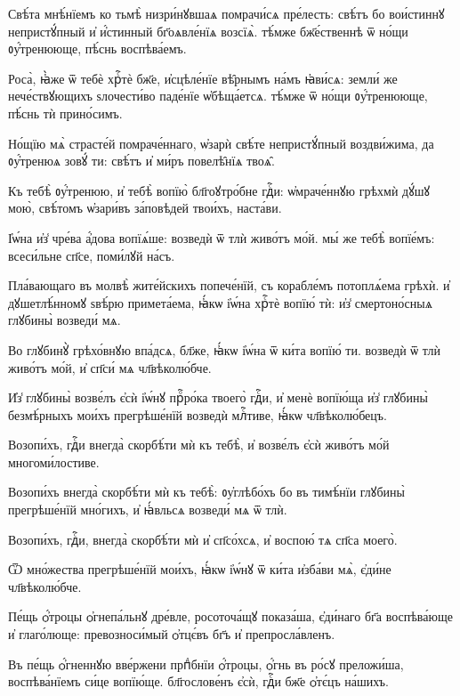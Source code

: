 \hKv Свѣ́та мнѣ́нїемъ ко тьмѣ̀ низри́нꙋвшаѧ помрачи́сѧ  пре́лесть: свѣ́тъ бо вои́стиннꙋ  непристꙋ́пный и҆ и҆́стинный бг҃оѧвле́нїѧ возсїѧ̀.  тѣ́мже бж҃е́ственнѣ ѿ но́щи ᲂу҆́тренююще, пѣ́снь  воспѣва́емъ. 

\hKv Роса̀, ꙗ҆̀же ѿ тебѐ хрⷭ҇тѐ бж҃е, и҆сцѣле́нїе вѣ̑рнымъ  на́мъ ꙗ҆ви́сѧ: земли́ же нече́ствꙋющихъ ѕлочести́во  паде́нїе ѡ҆бѣща́етсѧ. тѣ́мже ѿ но́щи ᲂу҆́тренююще,  пѣ́снь тѝ прино́симъ.  

\hKv Но́щїю мѧ̀ страсте́й помраче́ннаго, ѡ҆зарѝ свѣ́те  непристꙋ́пный воздви́жима, да ᲂу҆́тренюѧ зовꙋ́ ти: свѣ́тъ  и҆ ми́ръ повелѣ̑нїѧ твоѧ̑.  

\hKv Къ тебѣ̀ ᲂу҆́тренюю, и҆ тебѣ̀ вопїю̀ бл҃гоꙋтро́бне гдⷭ҇и:  ѡ҆мраче́ннꙋю грѣхмѝ дꙋ́шꙋ мою̀, свѣ́томъ ѡ҆зари́въ  за́повѣдей твои́хъ, наста́ви. 
%

\hKv І҆ѡ́на и҆з̾ чре́ва а҆́дова вопїѧ́ше: возведѝ ѿ тлѝ  живо́тъ мо́й. мы́ же тебѣ̀ вопїе́мъ: всеси́льне сп҃се,  поми́лꙋй на́съ.  
%

\hKv Пла́вающаго въ молвѣ̀ жите́йскихъ  попече́нїй, съ корабле́мъ потоплѧ́ема грѣхѝ. и҆  дꙋшетлѣ́нномꙋ ѕвѣ́рю примета́ема, ꙗ҆́кѡ і҆ѡ́на хрⷭ҇тѐ  вопїю́ тѝ: и҆з̾ смертоно́сныѧ глꙋбины̀ возведи́ мѧ. 
%

\hKv Во глꙋбинꙋ̀ грѣхо́внꙋю впа́дсѧ, бл҃же, ꙗ҆́кѡ і҆ѡ́на ѿ  ки́та вопїю́ ти. возведѝ ѿ тлѝ живо́тъ мо́й, и҆ сп҃си́  мѧ чл҃вѣколю́бче. 

\hKv И҆з̾ глꙋбины̀ возве́лъ є҆сѝ і҆ѡ́нꙋ прⷪ҇ро́ка твоего̀  гдⷭ҇и, и҆ менѐ вопїю́ща и҆з̾ глꙋбины̀ безмѣ́рныхъ мои́хъ  прегрѣше́нїй возведѝ млⷭ҇тиве, ꙗ҆́кѡ чл҃вѣколю́бецъ. 

\hKv Возопи́хъ, гдⷭ҇и внегда̀ скорбѣ́ти мѝ къ тебѣ̀, и҆  возве́лъ є҆сѝ живо́тъ мо́й многоми́лостиве. 

\hKv Возопи́хъ внегда̀ скорбѣ́ти мѝ къ тебѣ̀: ᲂу҆глѣбо́хъ бо  въ тимѣ́нїи глꙋбины̀ прегрѣше́нїй мно́гихъ, и҆ ꙗ҆́вльсѧ  возведи́ мѧ ѿ тлѝ.  

\hKv Возопи́хъ, гдⷭ҇и, внегда̀ скорбѣ́ти мѝ и҆ сп҃со́хсѧ, и҆  воспою́ тѧ сп҃са моего̀. 

\hKv Ѿ мно́жества прегрѣше́нїй мои́хъ, ꙗ҆́кѡ і҆ѡ́нꙋ ѿ ки́та  и҆зба́ви мѧ̀, є҆ди́не чл҃вѣколю́бче. 
%

\hKv Пе́щь ѻ҆́троцы ѻ҆гнепа́льнꙋ дре́вле, росоточа́щꙋ  показа́ша, є҆ди́наго бг҃а воспѣва́юще и҆ глаго́люще:  превозноси́мый ѻ҆тцє́въ бг҃ъ и҆ препросла́вленъ. 
%

\hKv Въ пе́щь ѻ҆́гненнꙋю вве́ржени прпⷣбнїи  ѻ҆́троцы, ѻ҆́гнь въ ро́сꙋ преложи́ша, воспѣва́нїемъ си́це  вопїю́ще. бл҃гослове́нъ є҆сѝ, гдⷭ҇и бж҃е ѻ҆тє́цъ  на́шихъ. 
%

